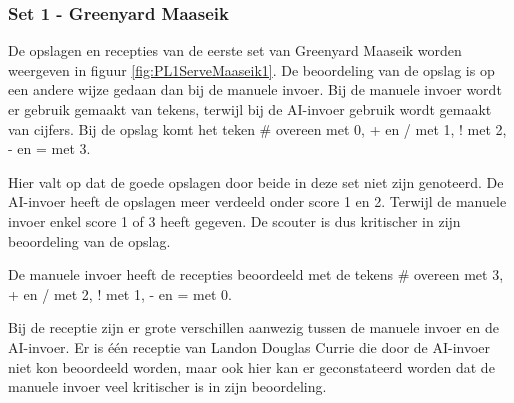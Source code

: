 \subsubsection{Set 1 - Greenyard Maaseik}
\label{sec:PL1_Greenyard1}
De opslagen en recepties van de eerste set van Greenyard Maaseik worden weergeven in figuur  \ref{fig:PL1ServeMaaseik1}. De beoordeling van de opslag is op een andere wijze gedaan dan bij de manuele invoer. Bij de manuele invoer wordt er gebruik gemaakt van tekens, terwijl bij de AI-invoer gebruik wordt gemaakt van cijfers. Bij de opslag komt het teken \# overeen met 0, + en / met 1, ! met 2, - en = met 3.

Hier valt op dat de goede opslagen door beide in deze set niet zijn genoteerd. De AI-invoer heeft de opslagen meer verdeeld onder score 1 en 2. Terwijl de manuele invoer enkel score 1 of 3 heeft gegeven. De scouter is dus kritischer in zijn beoordeling van de opslag.

De manuele invoer heeft de recepties beoordeeld met de tekens \# overeen met 3, + en / met 2, ! met 1, - en = met 0.

Bij de receptie zijn er grote verschillen aanwezig tussen de manuele invoer en de AI-invoer. Er is één receptie van Landon Douglas Currie die door de AI-invoer niet kon beoordeeld worden, maar ook hier kan er geconstateerd worden dat de manuele invoer veel kritischer is in zijn beoordeling. 

